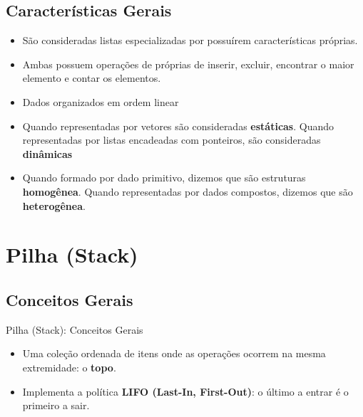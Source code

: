 \documentclass{beamer}
\begin{document}
\subsection{Características Gerais}
\begin{frame}
 \begin{itemize}
  \item São consideradas listas especializadas por possuírem características próprias.
  \item Ambas possuem operações de próprias de inserir, excluir, encontrar o maior elemento e contar os elementos.
  \item Dados organizados em ordem linear
  \item Quando representadas por vetores são consideradas \textbf{estáticas}. Quando representadas por listas encadeadas com ponteiros, são consideradas \textbf{dinâmicas}
  \item Quando formado por dado primitivo, dizemos que são estruturas \textbf{homogênea}. Quando representadas por dados compostos, dizemos que são \textbf{heterogênea}.
 \end{itemize}

\end{frame}



\section{Pilha (Stack)}
\subsection{Conceitos Gerais}

\begin{frame}{Pilha (Stack): Conceitos Gerais}
\begin{itemize}
    \item Uma coleção ordenada de itens onde as operações ocorrem na mesma extremidade: o \textbf{topo}.
    \item Implementa a política \textbf{LIFO (Last-In, First-Out)}: o último a entrar é o primeiro a sair.
\end{itemize}
\begin{center}
\end{center}
\end{frame}
\end{document}
